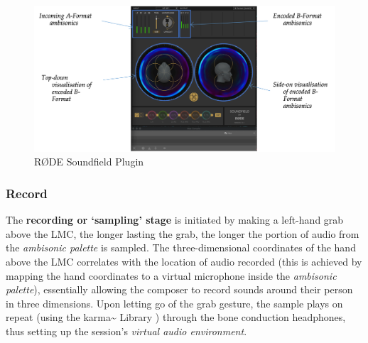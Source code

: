 \begin{figure}
    \centering
    \includegraphics[width=\linewidth]{figures/05-area/areatechnical_rode.png}
    \caption{RØDE Soundfield Plugin}
    \label{fig: areatechnicalrode}
\end{figure}

\subsubsection{Record}                          \label{sec: area-system-software-record}
The \textbf{recording or ‘sampling’ stage} is initiated by making a left-hand grab above the LMC, the longer lasting the grab, the longer the portion of audio from the \textit{ambisonic palette} is sampled. The three-dimensional coordinates of the hand above the LMC correlates with the location of audio recorded (this is achieved by mapping the hand coordinates to a virtual microphone inside the \textit{ambisonic palette}), essentially allowing the composer to record sounds around their person in three dimensions. Upon letting go of the grab gesture, the sample plays on repeat (using the karma\textasciitilde{} Library \citep{constanzo2015}) through the bone conduction headphones, thus setting up the session’s \textit{virtual audio environment}.

